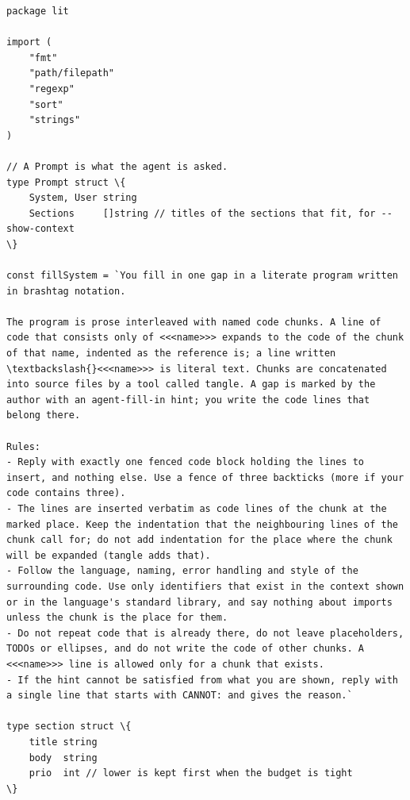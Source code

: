 \documentclass[10pt,a4paper]{article}
\newcounter{chunk}
\begin{document}
\begin{Verbatim}
package lit

import (
	"fmt"
	"path/filepath"
	"regexp"
	"sort"
	"strings"
)

// A Prompt is what the agent is asked.
type Prompt struct \{
	System, User string
	Sections     []string // titles of the sections that fit, for --show-context
\}

const fillSystem = `You fill in one gap in a literate program written in brashtag notation.

The program is prose interleaved with named code chunks. A line of code that consists only of <<<name>>> expands to the code of the chunk of that name, indented as the reference is; a line written \textbackslash{}<<<name>>> is literal text. Chunks are concatenated into source files by a tool called tangle. A gap is marked by the author with an agent-fill-in hint; you write the code lines that belong there.

Rules:
- Reply with exactly one fenced code block holding the lines to insert, and nothing else. Use a fence of three backticks (more if your code contains three).
- The lines are inserted verbatim as code lines of the chunk at the marked place. Keep the indentation that the neighbouring lines of the chunk call for; do not add indentation for the place where the chunk will be expanded (tangle adds that).
- Follow the language, naming, error handling and style of the surrounding code. Use only identifiers that exist in the context shown or in the language's standard library, and say nothing about imports unless the chunk is the place for them.
- Do not repeat code that is already there, do not leave placeholders, TODOs or ellipses, and do not write the code of other chunks. A <<<name>>> line is allowed only for a chunk that exists.
- If the hint cannot be satisfied from what you are shown, reply with a single line that starts with CANNOT: and gives the reason.`

type section struct \{
	title string
	body  string
	prio  int // lower is kept first when the budget is tight
\}
\end{Verbatim}
\end{document}
